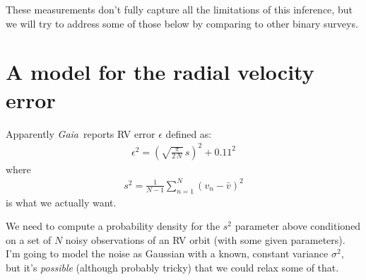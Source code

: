 \documentclass[modern, letterpaper]{aastex631}
\newcommand{\project}[1]{\textsl{#1}}
\newcommand{\Gaia}{\project{Gaia}}
\begin{document}
These measurements don't fully capture all the limitations of this inference, but we will try to address some of those below by comparing to other binary surveys.


\section{A model for the radial velocity error}

Apparently \Gaia\ reports RV error $\epsilon$ defined as:
\begin{eqnarray}
	\epsilon^2 = \left(\sqrt{\frac{\pi}{2\,N}}\,s\right)^2 + 0.11^2
\end{eqnarray}
where
\begin{eqnarray}
	s^2 = \frac{1}{N-1}\sum_{n=1}^N \left(v_n - \bar{v}\right)^2
\end{eqnarray}
is what we actually want.

We need to compute a probability density for the $s^2$ parameter above conditioned on a set of $N$ noisy observations of an RV orbit (with some given parameters).
I'm going to model the noise as Gaussian with a known, constant variance $\sigma^2$, but it's \emph{possible} (although probably tricky) that we could relax some of that.
\end{document}
